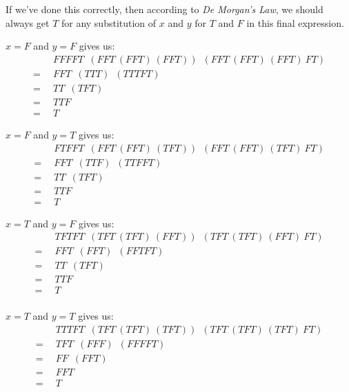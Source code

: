 \documentclass[11pt]{article}
\begin{document}

If we've done this correctly, then according to \emph{De Morgan's Law}, we
should always get \(T\) for any substitution of \(x\) and \(y\) for \(T\) and
\(F\) in this final expression.

\(x=F\) and \(y=F\) gives us:
\begin{align*}
	&\enspace FFFFT\enspace
		(FFT\:(FFT)\:(FFT))\enspace
		(FFT\:(FFT)\:(FFT)\:FT)\\
	=&\enspace FFT\enspace(TTT)\enspace(TTTFT)\\
	=&\enspace TT\enspace(TFT)\\
	=&\enspace TTF\\
	=&\enspace T
\end{align*}

\(x=F\) and \(y=T\) gives us:
\begin{align*}
	&\enspace FTFFT\enspace
		(FFT\:(FFT)\:(TFT))\enspace
		(FFT\:(FFT)\:(TFT)\:FT)\\
	=&\enspace FFT\enspace(TTF)\enspace(TTFFT)\\
	=&\enspace TT\enspace(TFT)\\
	=&\enspace TTF\\
	=&\enspace T
\end{align*}

\(x=T\) and \(y=F\) gives us:
\begin{align*}
	&\enspace TFTFT\enspace
		(TFT\:(TFT)\:(FFT))\enspace
		(TFT\:(TFT)\:(FFT)\:FT)\\
	=&\enspace FFT\enspace(FFT)\enspace(FFTFT)\\
	=&\enspace TT\enspace(TFT)\\
	=&\enspace TTF\\
	=&\enspace T\\
\end{align*}

\(x=T\) and \(y=T\) gives us:
\begin{align*}
	&\enspace TTTFT\enspace
		(TFT\:(TFT)\:(TFT))\enspace
		(TFT\:(TFT)\:(TFT)\:FT)\\
	=&\enspace TFT\enspace(FFF)\enspace(FFFFT)\\
	=&\enspace FF\enspace(FFT)\\
	=&\enspace FFT\\
	=&\enspace T
\end{align*}
\end{document}

